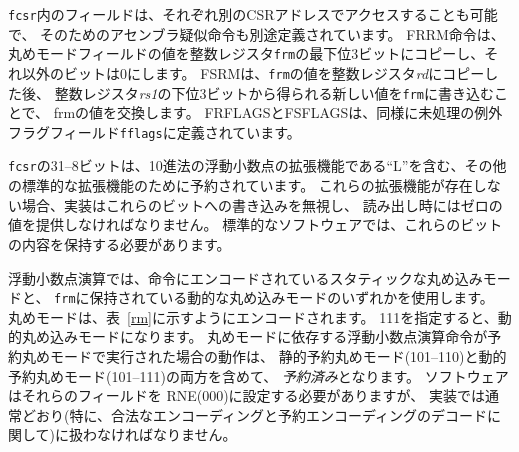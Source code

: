 {\tt fcsr}内のフィールドは、それぞれ別のCSRアドレスでアクセスすることも可能で、
そのためのアセンブラ疑似命令も別途定義されています。
FRRM命令は、丸めモードフィールドの値を整数レジスタ{\tt frm}の最下位3ビットにコピーし、それ以外のビットは0にします。 
FSRMは、{\tt frm}の値を整数レジスタ{\em rd}にコピーした後、
整数レジスタ{\em rs1}の下位3ビットから得られる新しい値を{\tt frm}に書き込むことで、
frmの値を交換します。 
FRFLAGSとFSFLAGSは、同様に未処理の例外フラグフィールド{\tt fflags}に定義されています。

\begin{comment}
Bits 31--8 of the {\tt fcsr} are reserved for other standard extensions,
including the ``L'' standard extension for decimal floating-point.  If
these extensions are not present, implementations shall ignore writes to
these bits and supply a zero value when read.  Standard software should
preserve the contents of these bits.
\end{comment}

{\tt fcsr}の31--8ビットは、10進法の浮動小数点の拡張機能である``L''を含む、その他の標準的な拡張機能のために予約されています。 
これらの拡張機能が存在しない場合、実装はこれらのビットへの書き込みを無視し、
読み出し時にはゼロの値を提供しなければなりません。 
標準的なソフトウェアでは、これらのビットの内容を保持する必要があります。

\begin{comment}
Floating-point operations use either a static rounding mode encoded in
the instruction, or a dynamic rounding mode held in {\tt frm}.
Rounding modes are encoded as shown in Table~\ref{rm}.  A value of 111
in the instruction's {\em rm} field selects the dynamic rounding mode
held in {\tt frm}.  The behavior of floating-point instructions that
depend on rounding mode when executed with a reserved rounding mode is
{\em reserved}, including both static reserved rounding modes (101--110) and
dynamic reserved rounding modes (101--111).  Some instructions, including
widening conversions, have the {\em rm} field but are nevertheless
mathematically unaffected by the rounding mode; software should set their
{\em rm} field to RNE (000) but implementations must treat the {\em rm}
field as usual (in particular, with regard to decoding legal vs. reserved
encodings).
\end{comment}

浮動小数点演算では、命令にエンコードされているスタティックな丸め込みモードと、
{\tt frm}に保持されている動的な丸め込みモードのいずれかを使用します。
丸めモードは、表~\ref{rm}に示すようにエンコードされます。 
111を指定すると、動的丸め込みモードになります。 
丸めモードに依存する浮動小数点演算命令が予約丸めモードで実行された場合の動作は、
静的予約丸めモード(101--110)と動的予約丸めモード(101--111)の両方を含めて、
{\em 予約済み}となります。 
ソフトウェアはそれらのフィールドを RNE(000)に設定する必要がありますが、
実装では通常どおり(特に、合法なエンコーディングと予約エンコーディングのデコードに関して)に扱わなければなりません。

